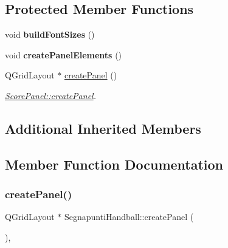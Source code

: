 \subsection*{Protected Member Functions}
\begin{DoxyCompactItemize}
\item 
\mbox{\label{classSegnapuntiHandball_af58954a40f61cc590bba6f1959dea25a}} 
void {\bfseries build\+Font\+Sizes} ()
\item 
\mbox{\label{classSegnapuntiHandball_a4802d860985b26f96164ddaf43532087}} 
void {\bfseries create\+Panel\+Elements} ()
\item 
Q\+Grid\+Layout $\ast$ \mbox{\hyperlink{classSegnapuntiHandball_a9ec2eff0a86fe7fad3b03a0f013af603}{create\+Panel}} ()
\begin{DoxyCompactList}\small\item\em \mbox{\hyperlink{classScorePanel_aae4f1b7b8ee1afc61ac53105f8657fdb}{Score\+Panel\+::create\+Panel}}. \end{DoxyCompactList}\end{DoxyCompactItemize}
\subsection*{Additional Inherited Members}


\subsection{Member Function Documentation}
\mbox{\label{classSegnapuntiHandball_a9ec2eff0a86fe7fad3b03a0f013af603}} 
\subsubsection{\texorpdfstring{create\+Panel()}{createPanel()}}
{\footnotesize\ttfamily Q\+Grid\+Layout $\ast$ Segnapunti\+Handball\+::create\+Panel (\begin{DoxyParamCaption}{ }\end{DoxyParamCaption})\hspace{0.3cm}{\ttfamily [protected]}, {\ttfamily [virtual]}}



